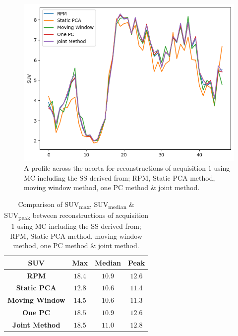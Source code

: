     \begin{figure}
        \centering
        \includegraphics[width=0.5\linewidth]{figures/profile_pca.png}
        \captionsetup{singlelinecheck=false, justification=centering}
        \caption{A profile across the aeorta for reconstructions of acquisition $1$ using \gls{MC} including the \gls{SS} derived from; \gls{RPM}, Static \gls{PCA} method, moving window method, one \gls{PC} method \& joint method.}
        \label{fig:profile}
    \end{figure}
    
    \begin{table}
        \centering
        \captionsetup{singlelinecheck=false, justification=centering}
        \caption{Comparison of \gls{SUV}\textsubscript{max}, \gls{SUV}\textsubscript{median} \& \gls{SUV}\textsubscript{peak} between reconstructions of acquisition $1$ using \gls{MC} including the \gls{SS} derived from; \gls{RPM}, Static \gls{PCA} method, moving window method, one \gls{PC} method \& joint method.}
        
        \resizebox*{0.5\linewidth}{!}
        {
            \begin{tabular}{||c|ccc||}
                \hline
                \textbf{\gls{SUV}} & \textbf{Max} & \textbf{Median} & \textbf{Peak} \\
                \hline
                \textbf{\gls{RPM}}          & $18.4$ & $10.9$ & $12.6$ \\
                \hline
                \textbf{Static \gls{PCA}}   & $12.8$ & $10.6$ & $11.4$ \\
                \textbf{Moving Window}      & $14.5$ & $10.6$ & $11.3$ \\
                \textbf{One \gls{PC}}       & $18.5$ & $10.9$ & $12.6$ \\
                \textbf{Joint Method}       & $18.5$ & $11.0$ & $12.8$ \\
                \hline
            \end{tabular}
        }
        \label{tab:suv}
    \end{table}
    
